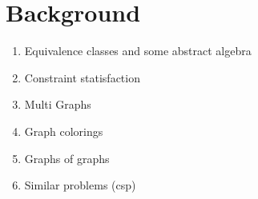 \documentclass{article}
\begin{document}
\section{Background}

\begin{enumerate}
  \item Equivalence classes and some abstract algebra
  \item Constraint statisfaction
  \item Multi Graphs
  \item Graph colorings
  \item Graphs of graphs
  \item Similar problems (csp)
\end{enumerate}

\printbibliography
\end{document}
